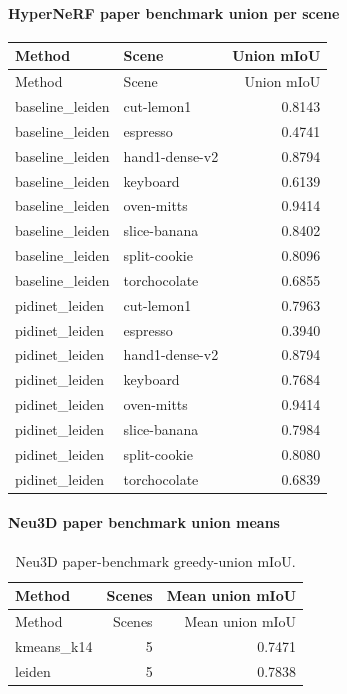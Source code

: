 \documentclass[10pt]{article}
\begin{document}
\paragraph{HyperNeRF paper benchmark union per scene}
\small
\begin{longtable}{llr}
\toprule
Method & Scene & Union mIoU \\
\midrule
\endfirsthead
\toprule
Method & Scene & Union mIoU \\
\midrule
\endhead
baseline\_leiden & cut-lemon1 & 0.8143 \\
baseline\_leiden & espresso & 0.4741 \\
baseline\_leiden & hand1-dense-v2 & 0.8794 \\
baseline\_leiden & keyboard & 0.6139 \\
baseline\_leiden & oven-mitts & 0.9414 \\
baseline\_leiden & slice-banana & 0.8402 \\
baseline\_leiden & split-cookie & 0.8096 \\
baseline\_leiden & torchocolate & 0.6855 \\
pidinet\_leiden & cut-lemon1 & 0.7963 \\
pidinet\_leiden & espresso & 0.3940 \\
pidinet\_leiden & hand1-dense-v2 & 0.8794 \\
pidinet\_leiden & keyboard & 0.7684 \\
pidinet\_leiden & oven-mitts & 0.9414 \\
pidinet\_leiden & slice-banana & 0.7984 \\
pidinet\_leiden & split-cookie & 0.8080 \\
pidinet\_leiden & torchocolate & 0.6839 \\
\bottomrule
\end{longtable}
\normalsize

\paragraph{Neu3D paper benchmark union means}
\small
\begin{longtable}{lrr}
\caption{Neu3D paper-benchmark greedy-union mIoU.}\\
\toprule
Method & Scenes & Mean union mIoU \\
\midrule
\endfirsthead
\toprule
Method & Scenes & Mean union mIoU \\
\midrule
\endhead
kmeans\_k14 & 5 & 0.7471 \\
leiden & 5 & 0.7838 \\
\bottomrule
\end{longtable}
\normalsize
\end{document}
